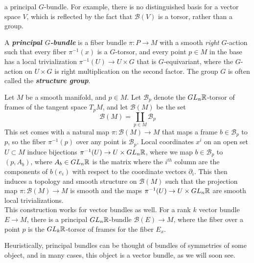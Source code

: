 \documentclass[abstract=on,twoside]{scrreprt}
\begin{document}
a principal $G$-bundle. For example, there is no distinguished basis for a vector
space $V$, which is reflected by the fact that $\mathcal{B}(V)$ is a torsor, rather
than a group.
%
\begin{definition}
A \textbf{\textit{principal $G$-bundle}} is a fiber bundle $\pi : P \to M$ with a
smooth \emph{right} $G$-action such that every fiber $\pi^{-1}(x)$ is a $G$-torsor,
and every point $p \in M$ in the base has a local trivialization
$\pi^{-1}(U) \to U \times G$ that is $G$-equivariant, where the $G$-action on
$U \times G$ is right multiplication on the second factor. The group $G$ is often
called the \textbf{\textit{structure group}}.
\end{definition}
%
\begin{example}
Let $M$ be a smooth manifold, and $p \in M$. Let $\mathcal{B}_p$ denote the
$GL_n\mathbb{R}$-torsor of frames of the tangent space $T_pM$, and let
$\mathcal{B}(M)$ be the set
\[
\mathcal{B}(M) = \coprod_{p \in M} \mathcal{B}_p
\]
This set comes with a natural map $\pi : \mathcal{B}(M) \to M$ that maps a frame
$b \in \mathcal{B}_p$ to $p$, so the fiber $\pi^{-1}(p)$ over any point is
$\mathcal{B}_p$. Local coordinates $x^i$ on an open set $U \subset M$ induce bijections
$\pi^{-1}(U) \to U \times GL_n\mathbb{R}$, where we map $b \in \mathcal{B}_p$ to
$(p, A_b)$, where $A_b \in GL_n\mathbb{R} $ is the matrix where the $i^{th}$ column are the
components of $b(e_i)$ with respect to the coordinate vectors $\partial_i$. This
then induces a topology and smooth structure on $\mathcal{B}(M)$ such that
the projection map $\pi : \mathcal{B}(M) \to M$ is smooth and the maps
$\pi^{-1}(U) \to U \times GL_n\mathbb{R}$ are smooth local trivializations. \\

This construction works for vector bundles as well. For a rank $k$ vector bundle
$E \to M$, there is a principal $GL_n\mathbb{R}$-bundle $\mathcal{B}(E) \to M$, where the fiber
over a point $p$ is the $GL_k\mathbb{R}$-torsor of frames for the fiber $E_x$.
\end{example}
%
Heuristically, principal bundles can be thought of bundles of symmetries of some
object, and in many cases, this object is a vector bundle, as we will soon see.
%
\end{document}
